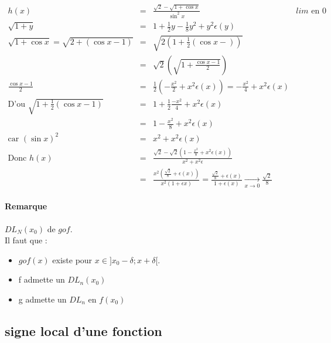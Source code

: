 \[\begin{array}{rclr}
h(x) &=& \frac{\sqrt{2} - \sqrt{1+\cos x}}{\sin^2 x} & lim \text{ en } 0 \\
\sqrt{1+y} &=& 1 + \frac{1}{2} y - \frac{1}{8}y^2 + y^2 \epsilon (y) \\
\sqrt{1 + \cos x} = \sqrt{2+(\cos x - 1)} &=& \sqrt{2(1 + \frac{1}{2}(\cos x -))}\\
&=& \sqrt{2}(\sqrt{1+\frac{\cos x - 1}{2}}) \\
\frac{\cos x -1}{2} &=& \frac{1}{2}(-\frac{x^2}{2} + x^2 \epsilon (x)) = - \frac{x^2}{4} + x^2 \epsilon (x) \\
\text{D'ou } \sqrt{1+\frac{1}{2}(\cos x - 1)} &=& 1 + \frac{1}{2}\frac{-x^2}{4} + x^2 \epsilon (x) \\
&=& 1 - \frac{x^2}{8} + x^2 \epsilon (x) \\
\text{car } (\sin x)^2 &=& x^2 + x^2 \epsilon (x) \\
\text{Donc } h(x) &=& \frac{\sqrt{2} - \sqrt{2}(1-\frac{x^2}{8} + x^2 \epsilon (x))}{x^2 + x^2 \epsilon} \\
&=& \frac{x^2(\frac{\sqrt{2}}{8} + \epsilon (x))}{x^2(1+\epsilon x)} = \frac{\frac{\sqrt{2}}{8} + \epsilon (x)}{1+\epsilon (x)} \xrightarrow[x \to 0]{} \frac{\sqrt{2}}{8}
\end{array}\]

\paragraph{Remarque} $DL_N(x_0)$ de $gof$. ~\\
Il faut que :
\begin{itemize}
	\item $gof(x)$ existe pour $x \in ]x_0 - \delta; x + \delta[$. ~\\
	\item f admette un $DL_n(x_0)$
	\item g admette un $DL_n$ en $f(x_0)$
\end{itemize}

\subsection{signe local d'une fonction}
